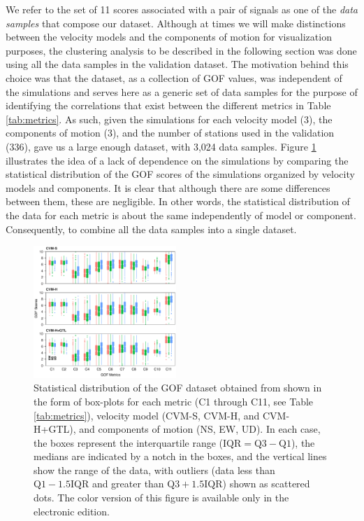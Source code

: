 We refer to the set of 11 scores associated with a pair of signals  as one of the \textit{data samples} that compose our dataset. Although at times we will make distinctions between the velocity models and the components of motion for visualization purposes, the clustering analysis to be described in the following section was done using all the data samples in the validation dataset. The motivation behind this choice was that the dataset, as a collection of GOF values, was independent of the simulations and serves here as a generic set of data samples for the purpose of identifying the correlations that exist between the different metrics in Table \ref{tab:metrics}. As such, given the simulations for each velocity model (3), the components of motion (3), and the number of stations used in the validation (336), gave us a large enough dataset, with 3,024 data samples. Figure \ref{fig:data-box-plot} illustrates the idea of a lack of dependence on the simulations by comparing the statistical distribution of the GOF scores of the simulations organized by velocity models and components. It is clear that although there are some differences between them, these are negligible. In other words, the statistical distribution of the data for each metric is about the same independently of model or component. Consequently,  to combine all the data samples into a single dataset.

\begin{figure}[ht!]
    \centering
    \includegraphics[width=0.48\textwidth]{figures/pdf/figure-03}
    \caption{Statistical distribution of the GOF dataset obtained from \citet{Taborda_2014_BSSA} shown in the form of box-plots for each metric (C1 through C11, see Table \ref{tab:metrics}), velocity model (CVM-S, CVM-H, and CVM-H+GTL), and components of motion (NS, EW, UD). In each case, the boxes represent the interquartile range ($\mathrm{IQR} = \mathrm{Q}3 - \mathrm{Q}1$), the medians are indicated by a notch in the boxes, and the vertical lines show the range of the data, with outliers (data less than $\mathrm{Q}1 - 1.5 \mathrm{IQR}$ and greater than $\mathrm{Q}3 + 1.5 \mathrm{IQR}$) shown as scattered dots. The color version of this figure is available only in the electronic edition.}
    \label{fig:data-box-plot}
\end{figure}
